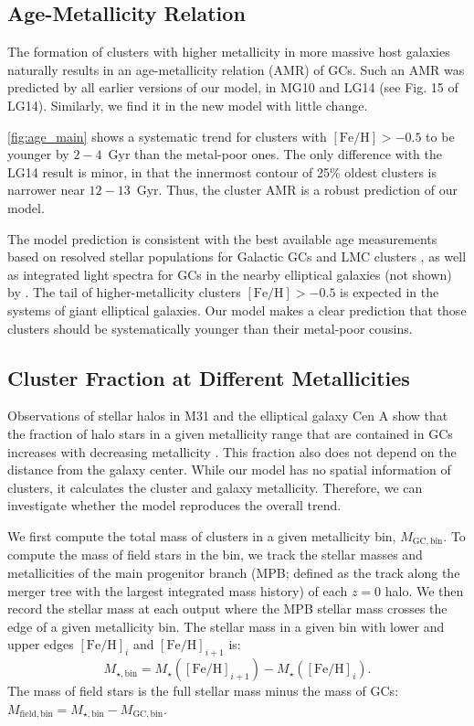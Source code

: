 \documentclass[fleqn,usenatbib]{mnras}
\newcommand{\Mstar}{M_{\star}}
\newcommand{\feh}{\mathrm{[Fe/H]}}
\begin{document}
\subsection{Age-Metallicity Relation}
\label{subsec:age_met}

The formation of clusters with higher metallicity in more massive host galaxies naturally results in an age-metallicity relation (AMR) of GCs. Such an AMR was predicted by all earlier versions of our model, in MG10 and LG14 (see Fig. 15 of LG14). Similarly, we find it in the new model with little change.

\autoref{fig:age_main} shows a systematic trend for clusters with $\feh > -0.5$ to be younger by $2-4$~Gyr than the metal-poor ones. The only difference with the LG14 result is minor, in that the innermost contour of 25\% oldest clusters is narrower near $12-13$~Gyr. Thus, the cluster AMR is a robust prediction of our model.

The model prediction is consistent with the best available age measurements based on resolved stellar populations for Galactic GCs \citep{dotter_etal11, vandenberg_etal13, leaman_etal13} and LMC clusters \citep{wagner-kaiser_etal_2017}, as well as integrated light spectra for GCs in the nearby elliptical galaxies (not shown) by \citet{georgiev_etal12}. The tail of higher-metallicity clusters $\feh > -0.5$ is expected in the systems of giant elliptical galaxies. Our model makes a clear prediction that those clusters should be systematically younger than their metal-poor cousins.

\subsection{Cluster Fraction at Different Metallicities}
\label{subsec:sn}

Observations of stellar halos in M31 and the elliptical galaxy Cen A show that the fraction of halo stars in a given metallicity range that are contained in GCs increases with decreasing metallicity \citep[e.g.,][]{lamers_etal_2017}. This fraction also does not depend on the distance from the galaxy center. While our model has no spatial information of clusters, it calculates the cluster and galaxy metallicity. Therefore, we can investigate whether the model reproduces the overall trend.

We first compute the total mass of clusters in a given metallicity bin, $M_{\mathrm{GC,bin}}$. To compute the mass of field stars in the bin, we track the stellar masses and metallicities of the main progenitor branch (MPB; defined as the track along the merger tree with the largest integrated mass history) of each $z=0$ halo. We then record the stellar mass at each output where the MPB stellar mass crosses the edge of a given metallicity bin. The stellar mass in a given  bin with lower and upper edges $\feh_i$ and $\feh_{i+1}$ is:
\begin{equation}
M_{\star,\mathrm{bin}} = \Mstar(\mathrm{[Fe/H]}_{i+1}) - \Mstar(\mathrm{[Fe/H]}_{i}).
\end{equation}
The mass of field stars is the full stellar mass minus the mass of GCs: $M_{\mathrm{field,bin}} = M_{\star,\mathrm{bin}} - M_{\mathrm{GC,bin}}$.
\end{document}
